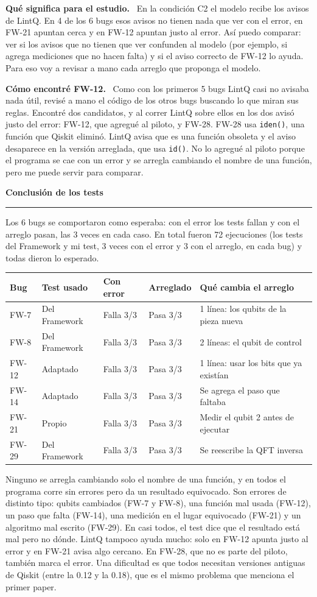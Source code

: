 \documentclass[11pt,a4paper]{article}
\newcommand{\paper}[1]{\vspace{1.2em}\par{\large\textbf{#1}}\par\vspace{0.2em}\hrule\vspace{0.4em}}
\newcommand{\parte}[1]{\par\textbf{#1.}\ }
\begin{document}
\parte{Qué significa para el estudio}
En la condición C2 el modelo recibe los avisos de LintQ. En 4 de los 6 bugs esos avisos no tienen nada que ver con el error, en FW-21 apuntan cerca y en FW-12 apuntan justo al error. Así puedo comparar: ver si los avisos que no tienen que ver confunden al modelo (por ejemplo, si agrega mediciones que no hacen falta) y si el aviso correcto de FW-12 lo ayuda. Para eso voy a revisar a mano cada arreglo que proponga el modelo.

\parte{Cómo encontré FW-12}
Como con los primeros 5 bugs LintQ casi no avisaba nada útil, revisé a mano el código de los otros bugs buscando lo que miran sus reglas. Encontré dos candidatos, y al correr LintQ sobre ellos en los dos avisó justo del error: FW-12, que agregué al piloto, y FW-28. FW-28 usa \texttt{iden()}, una función que Qiskit eliminó. LintQ avisa que es una función obsoleta y el aviso desaparece en la versión arreglada, que usa \texttt{id()}. No lo agregué al piloto porque el programa se cae con un error y se arregla cambiando el nombre de una función, pero me puede servir para comparar.

\paper{Conclusión de los tests}
Los 6 bugs se comportaron como esperaba: con el error los tests fallan y con el arreglo pasan, las 3 veces en cada caso. En total fueron 72 ejecuciones (los tests del Framework y mi test, 3 veces con el error y 3 con el arreglo, en cada bug) y todas dieron lo esperado.
\begin{center}
\small
\begin{tabular}{lllll}
\toprule
Bug & Test usado & Con error & Arreglado & Qué cambia el arreglo \\
\midrule
FW-7 & Del Framework & Falla 3/3 & Pasa 3/3 & 1 línea: los qubits de la pieza nueva \\
FW-8 & Del Framework & Falla 3/3 & Pasa 3/3 & 2 líneas: el qubit de control \\
FW-12 & Adaptado & Falla 3/3 & Pasa 3/3 & 1 línea: usar los bits que ya existían \\
FW-14 & Adaptado & Falla 3/3 & Pasa 3/3 & Se agrega el paso que faltaba \\
FW-21 & Propio & Falla 3/3 & Pasa 3/3 & Medir el qubit 2 antes de ejecutar \\
FW-29 & Del Framework & Falla 3/3 & Pasa 3/3 & Se reescribe la QFT inversa \\
\bottomrule
\end{tabular}
\end{center}
Ninguno se arregla cambiando solo el nombre de una función, y en todos el programa corre sin errores pero da un resultado equivocado. Son errores de distinto tipo: qubits cambiados (FW-7 y FW-8), una función mal usada (FW-12), un paso que falta (FW-14), una medición en el lugar equivocado (FW-21) y un algoritmo mal escrito (FW-29). En casi todos, el test dice que el resultado está mal pero no dónde. LintQ tampoco ayuda mucho: solo en FW-12 apunta justo al error y en FW-21 avisa algo cercano. En FW-28, que no es parte del piloto, también marca el error. Una dificultad es que todos necesitan versiones antiguas de Qiskit (entre la 0.12 y la 0.18), que es el mismo problema que menciona el primer paper.
\end{document}
